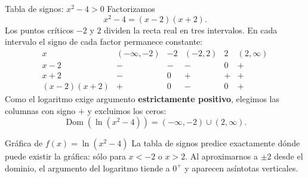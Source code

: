 \documentclass[aspectratio=169,10pt]{beamer}
\newcommand{\Dom}{\operatorname{Dom}}
\begin{document}
\begin{frame}{Tabla de signos: $x^2-4>0$}
Factorizamos
\[
x^2-4=(x-2)(x+2).
\]
Los puntos críticos $-2$ y $2$ dividen la recta real en tres intervalos. En
cada intervalo el signo de cada factor permanece constante:
\[
\begin{array}{c|ccccc}
x&(-\infty,-2)&-2&(-2,2)&2&(2,\infty)\\ \hline
x-2&-&-&-&0&+\\
x+2&-&0&+&+&+\\ \hline
(x-2)(x+2)&+&0&-&0&+
\end{array}
\]
Como el logaritmo exige argumento \textbf{estrictamente positivo}, elegimos
las columnas con signo $+$ y excluimos los ceros:
\[
\boxed{\Dom(\ln(x^2-4))=(-\infty,-2)\cup(2,\infty).}
\]
\end{frame}

\begin{frame}{Gráfica de $f(x)=\ln(x^2-4)$}
La tabla de signos predice exactamente dónde puede existir la gráfica: sólo
para $x<-2$ o $x>2$. Al aproximarnos a $\pm2$ desde el dominio, el argumento
del logaritmo tiende a $0^+$ y aparecen asíntotas verticales.
\begin{center}
\end{center}
\end{frame}
\end{document}
